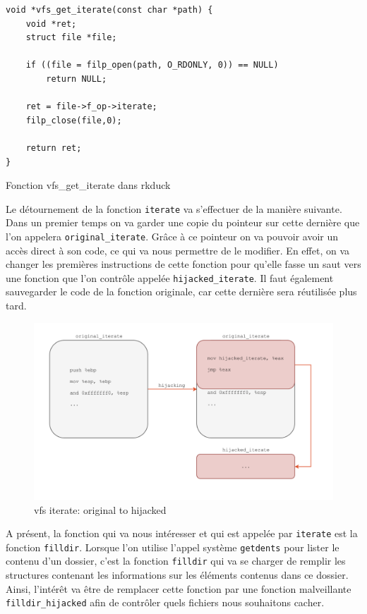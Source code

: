 \documentclass[12pt]{article}
\begin{document}
\begin{listing}[H]
\begin{verbatim}
void *vfs_get_iterate(const char *path) {
    void *ret;
    struct file *file;

    if ((file = filp_open(path, O_RDONLY, 0)) == NULL)
        return NULL;

    ret = file->f_op->iterate;
    filp_close(file,0);

    return ret;
}
\end{verbatim}
\caption{Fonction vfs\_get\_iterate dans rkduck}
\label{listing:3}
\end{listing}

        Le détournement de la fonction \texttt{iterate} va s'effectuer de la manière suivante. Dans un premier temps on va garder une copie du pointeur sur cette dernière que l'on appelera \texttt{original\_iterate}. Grâce à ce pointeur on va pouvoir avoir un accès direct à son code, ce qui va nous permettre de le modifier. En effet, on va changer les premières instructions de cette fonction pour qu'elle fasse un saut vers une fonction que l'on contrôle appelée \texttt{hijacked\_iterate}. Il faut également sauvegarder le code de la fonction originale, car cette dernière sera réutilisée plus tard. \\

\begin{figure}[H] 
\begin{center}
\includegraphics[scale=0.4]{./img/vfs_iterate_original_to_hijacked.png}

\caption[dsfsdf]{vfs iterate: original to hijacked}
\end{center}
\end{figure}

        A présent, la fonction qui va nous intéresser et qui est appelée par \texttt{iterate} est la fonction \texttt{filldir}. Lorsque l'on utilise l'appel système \texttt{getdents} pour lister le contenu d'un dossier, c'est la fonction \texttt{filldir} qui va se charger de remplir les structures contenant les informations sur les éléments contenus dans ce dossier. Ainsi, l'intérêt va être de remplacer cette fonction par une fonction malveillante \texttt{filldir\_hijacked} afin de contrôler quels fichiers nous souhaitons cacher.
\end{document}
